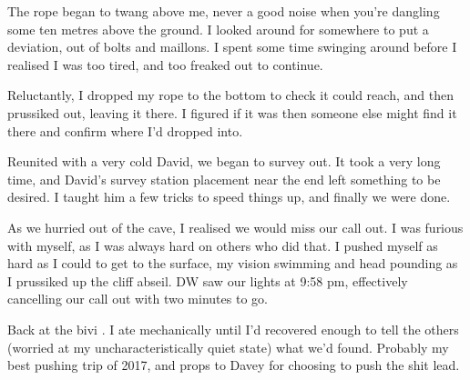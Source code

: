 The rope began to twang above me, never a good noise when you're dangling some ten metres above the ground. I looked around for somewhere to put a deviation, out of bolts and maillons. I spent some time swinging around before I realised I was too tired, and too freaked out to continue. 

Reluctantly, I dropped my rope to the bottom to check it could reach, and then prussiked out, leaving it there. I figured if it was  then someone else might find it there and confirm where I'd dropped into.

Reunited with a very cold David, we began to survey out. It took a very long time, and David's survey station placement near the end left something to be desired. I taught him a few tricks to speed things up, and finally we were done.

As we hurried out of the cave, I realised we would miss our call out. I was furious with myself, as I was always hard on others who did that. I pushed myself as hard as I could to get to the surface, my vision swimming and head pounding as I prussiked up the cliff abseil. DW saw our lights at 9:58 pm, effectively cancelling our call out with two minutes to go.

Back at the bivi . I ate mechanically until I'd recovered enough to tell the others (worried at my uncharacteristically quiet state) what we'd found. Probably my best pushing trip of 2017, and props to Davey for choosing to push the shit lead.


